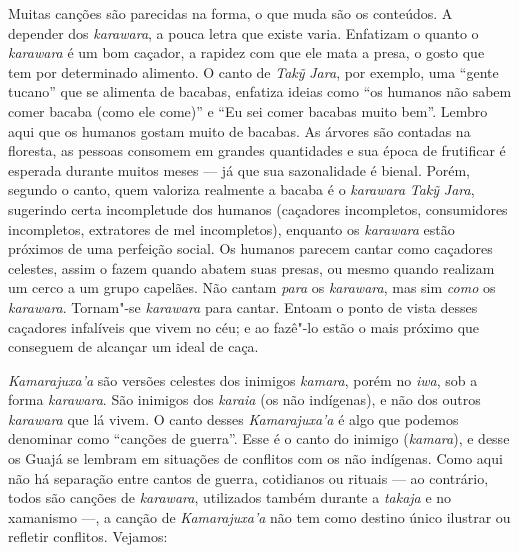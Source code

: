 Muitas canções são parecidas na forma, o que muda são os conteúdos. A
depender dos \emph{karawara}, a pouca letra que existe varia. Enfatizam
o quanto o \emph{karawara} é um bom caçador, a rapidez com que ele mata
a presa, o gosto que tem por determinado alimento. O canto de
\emph{Takỹ} \emph{Jara}, por exemplo, uma ``gente tucano'' que se
alimenta de bacabas, enfatiza ideias como ``os humanos não sabem comer
bacaba (como ele come)'' e ``Eu sei comer bacabas muito bem''. Lembro
aqui que os humanos gostam muito de bacabas. As árvores são contadas na
floresta, as pessoas consomem em grandes quantidades e sua época de
frutificar é esperada durante muitos meses --- já que sua sazonalidade é
bienal. Porém, segundo o canto, quem valoriza realmente a bacaba é o
\emph{karawara} \emph{Takỹ} \emph{Jara}, sugerindo certa incompletude
dos humanos (caçadores incompletos, consumidores incompletos, extratores
de mel incompletos), enquanto os \emph{karawara} estão próximos de uma
perfeição social. Os humanos parecem cantar como caçadores celestes,
assim o fazem quando abatem suas presas, ou mesmo quando realizam um
cerco a um grupo capelães. Não cantam \emph{para} os \emph{karawara},
mas sim \emph{como} os \emph{karawara}. Tornam"-se \emph{karawara} para
cantar. Entoam o ponto de vista desses caçadores infalíveis que vivem no
céu; e ao fazê"-lo estão o mais próximo que conseguem de alcançar um
ideal de caça.

\emph{Kamarajuxa'a} são versões celestes dos inimigos \emph{kamara},
porém no \emph{iwa}, sob a forma \emph{karawara}. São inimigos dos
\emph{karaia} (os não indígenas), e não dos outros \emph{karawara} que
lá vivem. O canto desses \emph{Kamarajuxa'a} é algo que podemos
denominar como ``canções de guerra''. Esse é o canto do inimigo
(\emph{kamara}), e desse os Guajá se lembram em situações de conflitos
com os não indígenas. Como aqui não há separação entre cantos de guerra,
cotidianos ou rituais --- ao contrário, todos são canções de
\emph{karawara}, utilizados também durante a \emph{takaja} e no
xamanismo ---, a canção de \emph{Kamarajuxa'a} não tem como destino único
ilustrar ou refletir conflitos. Vejamos:


